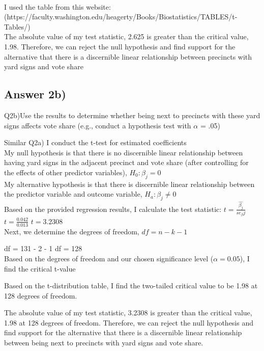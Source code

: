\documentclass{article}
\begin{document}
\\
I used the table from this website: 
(https://faculty.washington.edu/heagerty/Books/Biostatistics/TABLES/t-Tables/)
\\
The absolute value of my test statistic, 2.625 is greater than the 
critical value, 1.98. Therefore, we can reject the null hypothesis and 
find support for the alternative that there is a discernible linear 
relationship between precincts with yard signs and vote share
\\

\subsection{Answer 2b)}
Q2b)Use the results to determine whether being next to precincts with these yard signs affects vote share (e.g., conduct a hypothesis test with $\alpha$ = .05)

Similar Q2a) I conduct the t-test for estimated coefficients
\\
\noindent My null hypothesis is that there is no discernible linear relationship between having yard signs in the adjacent precinct and vote share (after controlling for the effects of other predictor variables), $H_0: \beta_j = 0$ 
\\
\noindent My alternative hypothesis is that there is discernible linear relationship between the predictor variable and outcome variable, $H_a: 
\beta_j \neq 0 $
\\
Based on the provided regression results, I calculate the test statistic:
$t = \frac{\hat{\beta_j}}{se_\beta j}$
\\
$t= \frac{0.042}{0.013}$
$t = 3.2308$
\\
Next, we determine the degrees of freedom,
$df = n - k - 1$

df = 131 - 2 - 1
df = 128
\\
\noindent Based on the degrees of freedom and our chosen significance level ($\alpha=0.05$), I find the critical t-value

\noindent Based on the t-distribution table, I find the two-tailed critical value to be 1.98 at 128 degrees of freedom.

The absolute value of my test statistic, 3.2308 is greater than the 
critical value, 1.98 at 128 degrees of freedom. Therefore, we can reject the null hypothesis and find support for the alternative that there is a discernible linear relationship between being next to precincts with yard signs and vote share. 
\end{document}

